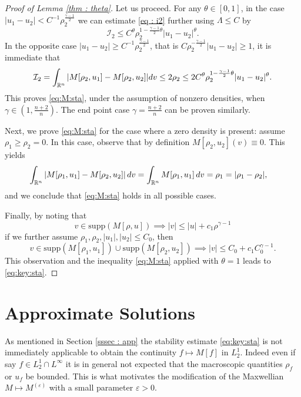 \documentclass{amsart}
\theoremstyle{plain}
\theoremstyle{remark}
\numberwithin{equation}{section}
\newcommand{\calI}{\mathcal I}
\newcommand{\R}{\mathbb{R}}
\newcommand{\ve}{\varepsilon}
\newcommand{\dv}{\textnormal{d}v}
\newcommand{\lt}{\left}
\newcommand{\rt}{\right}
\newcommand{\intr}{\int_{\R^n}}
\begin{document}
\begin{proof}[Proof of Lemma \ref{thm : theta}]
Let us proceed. For any $\theta \in [0,1]$, in the case $|u_1-u_2|< C^{-1}\rho_2^{\frac{\gamma-1}{2}}$ we can estimate \eqref{eq : i2} further using $\Lambda \le C$ by
\[
\calI_2 \le C^\theta \rho_2^{1- \frac{\gamma-1}{2}\theta} |u_1-u_2|^{\theta}.
\]
In the opposite case $|u_1-u_2| \ge C^{-1}\rho_2^{\frac{\gamma-1}{2}}$, that is $C \rho_2^{-\frac{\gamma-1}{2}}|u_1-u_2|\ge 1$, it is immediate that
\[
\calI_2 = \intr |M[\rho_2,u_1]-M[\rho_2,u_2]| \dv \le 2\rho_2 \le2 C^\theta \rho_2^{1- \frac{\gamma-1}{2}\theta}|u_1-u_2|^{\theta}.
\]
This proves \eqref{eq:M:sta}, under the assumption of nonzero densities, when $\gamma \in \lt(1,\frac{n+2}{n}\rt)$. The end point case $\gamma=\frac{n+2}{n}$ can be proven similarly.


Next, we prove \eqref{eq:M:sta} for the case where a zero density is present: assume $\rho_1 \ge \rho_2 = 0$. In this case, observe that by definition $M[\rho_2,u_2](v) \equiv 0$. This yields
\begin{align*}
    \int_{\R^n} |M[\rho_1,u_1] - M[\rho_2,u_2]| \,\dv &= \int_{\R^n} M[\rho_1,u_1] \,\dv = \rho_1 = |\rho_1 - \rho_2|,
\end{align*}
and we conclude that \eqref{eq:M:sta} holds in all possible cases.

Finally, by noting that
\[
v \in \text{supp} (M[\rho,u]) \implies |v| \le |u| + c_1\rho^{\gamma-1}
\]
if we further assume $\rho_1, \rho_2, |u_1|, |u_2| \le C_0$, then
\[
v \in \text{supp} (M[\rho_1,u_1]) \cup \text{supp} (M[\rho_2,u_2])\implies |v| \le C_0 + c_1 C_0^{\gamma-1}.
\]
This observation and the inequality \eqref{eq:M:sta} applied with $\theta = 1$ leads to \eqref{eq:key:sta}.


\end{proof}





\section{Approximate Solutions}\label{sec:app}

As mentioned in Section \ref{sssec : app} the stability estimate \eqref{eq:key:sta} is not immediately applicable to obtain the continuity $f \mapsto M[f]$ in $L^1_2$. Indeed even if say $f\in L^1_2 \cap L^\infty$ it is in general not expected that the macroscopic quantities $\rho_f$ or $u_f$ be bounded. This is what motivates the modification of the Maxwellian $M \mapsto M^{(\ve)}$ with a small parameter $\ve>0$.
\end{document}

